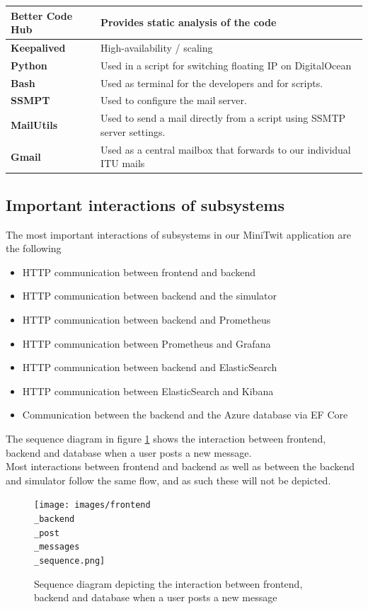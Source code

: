 \begin{center}
\begin{tabularx}{\textwidth}{|X|l|}
 \hline
 \textbf{Better Code Hub} & Provides static analysis of the code \\
 \hline
 \textbf{Keepalived} & High-availability / scaling \\
 \hline
 \textbf{Python} & Used in a script for switching floating IP on DigitalOcean  \\
 \hline
 \textbf{Bash} & Used as terminal for the developers and for scripts.\\
 \hline
 \textbf{SSMPT} & Used to configure the mail server.\\
 \hline
 \textbf{MailUtils} & Used to send a mail directly from a script using SSMTP server settings. \\
 \hline
 \textbf{Gmail} & Used as a central mailbox that forwards to our individual ITU mails \\[1ex] 
 \hline
\end{tabularx}
\end{center}

\subsection{Important interactions of subsystems}
The most important interactions of subsystems in our MiniTwit application are the following 
\begin{itemize}
    \item HTTP communication between frontend and backend
    \item HTTP communication between backend and the simulator
    \item HTTP communication between backend and Prometheus
    \item HTTP communication between Prometheus and Grafana
    \item HTTP communication between backend and ElasticSearch
    \item HTTP communication between ElasticSearch and Kibana
    \item Communication between the backend and the Azure database via EF Core
\end{itemize}

The sequence diagram in figure \ref{fig:SequenceDiagramPostMessage} shows the interaction between frontend, backend and database when a user posts a new message. \\
Most interactions between frontend and backend as well as between the backend and simulator follow the same flow, and as such these will not be depicted.

\begin{figure}[H]
 \centering
 \texttt{[image: images/frontend\\\_backend\\\_post\\\_messages\\\_sequence.png]}
 \caption{Sequence diagram depicting the interaction between frontend, backend and database when a user posts a new message}
 \label{fig:SequenceDiagramPostMessage}
\end{figure}

